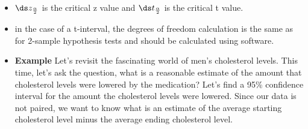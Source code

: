 \begin{itemize}
\begin{itemize}
\item $\ds z_{\frac{\alpha}{2}}$ is the critical z value and $\ds t_{\frac{\alpha}{2}}$ is the critical t value.
\item in the case of a t-interval, the degrees of freedom calculation is the same as for 2-sample hypothesis tests and should be calculated using software.
\end{itemize}
\begin{itemize}
\item {\bf Example} Let's revisit the fascinating world of men's cholesterol levels. This time, let's ask the question, what is a reasonable estimate of the amount that cholesterol levels were lowered by the medication?  Let's find a 95\% confidence interval for the amount the cholesterol levels were lowered.  Since our data is not paired, we want to know what is an estimate of the average starting cholesterol level minus the average ending cholesterol level.


\end{itemize}
\end{itemize}
